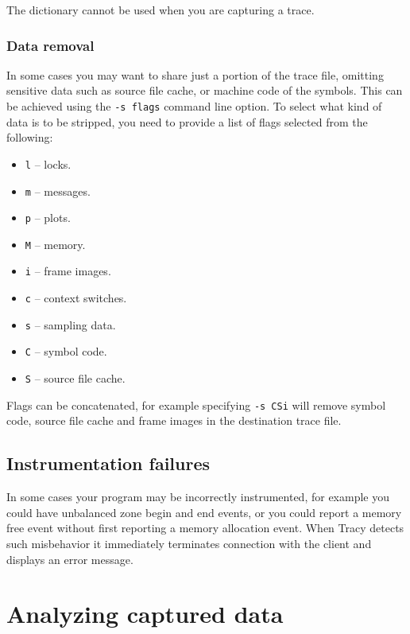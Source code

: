 \documentclass[hidelinks,titlepage,a4paper]{article}
\begin{document}
The dictionary cannot be used when you are capturing a trace.

\subsubsection{Data removal}
\label{dataremoval}

In some cases you may want to share just a portion of the trace file, omitting sensitive data such as source file cache, or machine code of the symbols. This can be achieved using the \texttt{-s flags} command line option. To select what kind of data is to be stripped, you need to provide a list of flags selected from the following:

\begin{itemize}
\item \texttt{l} -- locks.
\item \texttt{m} -- messages.
\item \texttt{p} -- plots.
\item \texttt{M} -- memory.
\item \texttt{i} -- frame images.
\item \texttt{c} -- context switches.
\item \texttt{s} -- sampling data.
\item \texttt{C} -- symbol code.
\item \texttt{S} -- source file cache.
\end{itemize}

Flags can be concatenated, for example specifying \texttt{-s CSi} will remove symbol code, source file cache and frame images in the destination trace file.

\subsection{Instrumentation failures}
\label{instrumentationfailures}

In some cases your program may be incorrectly instrumented, for example you could have unbalanced zone begin and end events, or you could report a memory free event without first reporting a memory allocation event. When Tracy detects such misbehavior it immediately terminates connection with the client and displays an error message.

\section{Analyzing captured data}
\label{analyzingdata}
\end{document}
